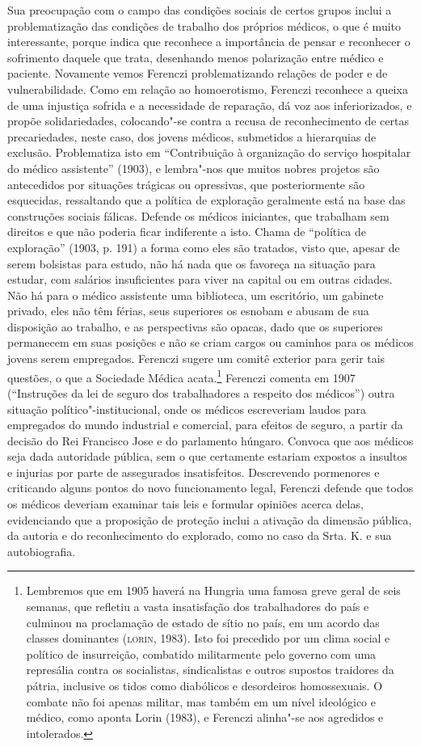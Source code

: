 Sua preocupação com o campo das condições sociais de certos grupos
inclui a problematização das condições de trabalho dos próprios médicos,
o que é muito interessante, porque indica que reconhece a importância de
pensar e reconhecer o sofrimento daquele que trata, desenhando menos
polarização entre médico e paciente. Novamente vemos Ferenczi
problematizando relações de poder e de vulnerabilidade. Como em relação
ao homoerotismo, Ferenczi reconhece a queixa de uma injustiça sofrida e
a necessidade de reparação, dá voz aos inferiorizados, e propõe
solidariedades, colocando"-se contra a recusa de reconhecimento de certas
precariedades, neste caso, dos jovens médicos, submetidos a hierarquias
de exclusão. Problematiza isto em ``Contribuição à organização do serviço
hospitalar do médico assistente'' (1903), e lembra"-nos que muitos nobres
projetos são antecedidos por situações trágicas ou opressivas, que
posteriormente são esquecidas, ressaltando que a política de exploração
geralmente está na base das construções sociais fálicas. Defende os
médicos iniciantes, que trabalham sem direitos e que não poderia ficar
indiferente a isto. Chama de ``política de exploração'' (1903, p. 191) a
forma como eles são tratados, visto que, apesar de serem bolsistas para
estudo, não há nada que os favoreça na situação para estudar, com
salários insuficientes para viver na capital ou em outras cidades. Não
há para o médico assistente uma biblioteca, um escritório, um gabinete
privado, eles não têm férias, seus superiores os esnobam e abusam de sua
disposição ao trabalho, e as perspectivas são opacas, dado que os
superiores permanecem em suas posições e não se criam cargos ou caminhos
para os médicos jovens serem empregados. Ferenczi sugere um comitê
exterior para gerir tais questões, o que a Sociedade Médica
acata.\footnote{Lembremos que em 1905 haverá na Hungria uma famosa greve
  geral de seis semanas, que refletiu a vasta insatisfação dos
  trabalhadores do país e culminou na proclamação de estado de sítio no
  país, em um acordo das classes dominantes (\textsc{lorin}, 1983). Isto foi
  precedido por um clima social e político de insurreição, combatido
  militarmente pelo governo com uma represália contra os socialistas,
  sindicalistas e outros supostos traidores da pátria, inclusive os
  tidos como diabólicos e desordeiros homossexuais. O combate não foi
  apenas militar, mas também em um nível ideológico e médico, como
  aponta Lorin (1983), e Ferenczi alinha"-se aos agredidos e intolerados.}
Ferenczi comenta em 1907 (``Instruções da lei de seguro dos trabalhadores
a respeito dos médicos'') outra situação político"-institucional, onde os
médicos escreveriam laudos para empregados do mundo industrial e
comercial, para efeitos de seguro, a partir da decisão do Rei Francisco
Jose  e do parlamento húngaro. Convoca que aos médicos seja dada
autoridade pública, sem o que certamente estariam expostos a insultos e
injurias por parte de assegurados insatisfeitos. Descrevendo pormenores
e criticando alguns pontos do novo funcionamento legal, Ferenczi defende
que todos os médicos deveriam examinar tais leis e formular opiniões
acerca delas, evidenciando que a proposição de proteção inclui a
ativação da dimensão pública, da autoria e do reconhecimento do
explorado, como no caso da Srta. K. e sua autobiografia.

